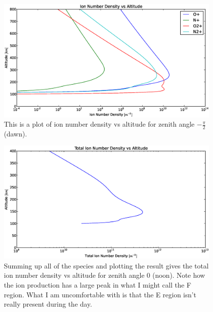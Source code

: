 \documentclass[10pt]{article}
\begin{document}
\begin{figure}[H]
	\centering
		\includegraphics[width=0.99\textwidth]{./dawn/B/Ion_Number_Density_vs_Altitude_100_800.eps}
	\caption{This is a plot of ion number density vs altitude for zenith angle $-\frac{\pi}{2}$ (dawn).}
	\label{fig:n2}
\end{figure}
\begin{figure}[H]
	\centering
		\includegraphics[width=0.99\textwidth]{./noon/B/Total_Ion_Number_Density_vs_Altitude_100_800.eps}
	\caption{Summing up all of the species and plotting the result gives the total ion number density vs altitude for zenith angle $0$ (noon). Note how the ion production has a large peak in what I might call the F region. What I am uncomfortable with is that the E region isn't really present during the day.}
	\label{fig:tot1}
\end{figure}
\end{document}
